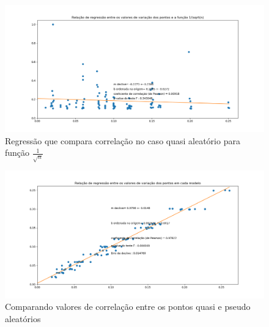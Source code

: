 \documentclass[a4paper, 12pt]{article}
\begin{document}
  \begin{figure}[h]
  \centering
  \includegraphics[scale=0.40]{regrecao1sqrt.png}
  \caption{Regressão que compara correlação no caso quasi aleatório para função  $\frac{1}{\sqrt{n}}$}
  \label{figura:regrecao1sqrt}
  \end{figure}
  
  
   \begin{figure}[h]
  \centering
  \includegraphics[scale=0.40]{regreentrecasos.png}
  \caption{Comparando valores de correlação entre os pontos quasi e pseudo aleatórios}
  \label{figura:regreentrecasos}
  \end{figure} 
  
  
\end{document}
